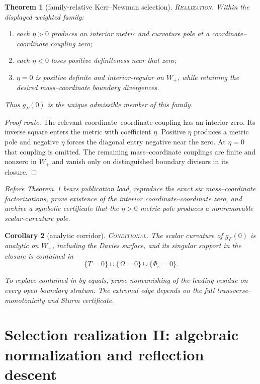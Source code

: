 \documentclass[11pt]{article}
\newtheorem{theorem}{Theorem}[section]
\newtheorem{corollary}[theorem]{Corollary}
\theoremstyle{remark}
\newcommand{\Wp}{W_+}
\newcommand{\status}[1]{\textup{\textsc{#1}}}
\newcommand{\realization}{\status{Realization}}
\newcommand{\conditional}{\status{Conditional}}
\newcommand{\proofstop}[1]{\par\medskip\noindent{\color{red!75!black}\textbf{STOP--PROOF.}} \textit{#1}\par\medskip}
\begin{document}
\begin{theorem}[family-relative Kerr--Newman selection]
\label{thm:metricselection}
\realization.
Within the displayed weighted family:
\begin{enumerate}[label=(\roman*)]
\item each $\eta>0$ produces an interior metric and curvature pole at a
coordinate--coordinate coupling zero;
\item each $\eta<0$ loses positive definiteness near that zero;
\item $\eta=0$ is positive definite and interior-regular on $\Wp$,
while retaining the desired mass--coordinate boundary divergences.
\end{enumerate}
Thus $g_F(0)$ is the unique admissible member of this family.
\end{theorem}

\begin{proof}[Proof route]
The relevant coordinate--coordinate coupling has an interior zero. Its inverse square
enters the metric with coefficient $\eta$. Positive $\eta$ produces a
metric pole and negative $\eta$ forces the diagonal entry negative near
the zero. At $\eta=0$ that coupling is omitted. The remaining mass--coordinate
couplings are finite and nonzero in $\Wp$ and vanish only on distinguished
boundary divisors
in its closure.
\end{proof}

\proofstop{Before Theorem~\ref{thm:metricselection} bears publication
load, reproduce the exact six mass--coordinate factorizations, prove existence
of the interior coordinate--coordinate zero, and archive a symbolic certificate that the
$\eta>0$ metric pole produces a nonremovable scalar-curvature pole.}

\begin{corollary}[analytic corridor]\label{cor:interior}
\conditional.
The scalar curvature of $g_F(0)$ is analytic on $\Wp$, including the
Davies surface, and its singular support in the closure is contained in
\[
\{T=0\}\cup\{\Omega=0\}\cup\{\Phi_e=0\}.
\]
\end{corollary}

\proofstop{To replace contained in by equals, prove nonvanishing of the
leading residue on every open boundary stratum. The extremal edge depends on
the full transverse-monotonicity and Sturm certificate.}

\section{Selection realization II: algebraic normalization and reflection descent}
\end{document}
